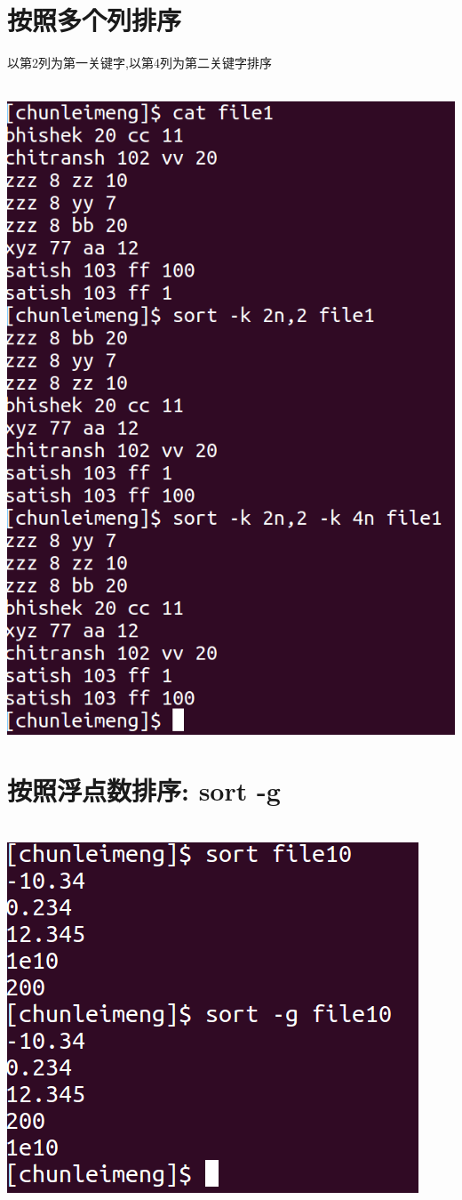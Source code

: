 \documentclass{article}
\begin{document}
\section{按照多个列排序}
以第2列为第一关键字,以第4列为第二关键字排序 \par
~\\
\includegraphics[scale=0.5]{pic10.png} \par

\section{按照浮点数排序: sort -g}
~\\
\includegraphics[scale=0.5]{pic9.png} \par
\end{document}
